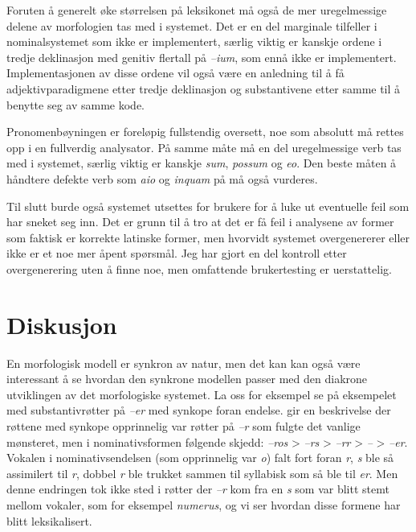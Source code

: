 \documentclass{article}
\let\w\emph
\begin{document}
Foruten \aa{} generelt \o{}ke st\o{}rrelsen p\aa{} leksikonet m\aa{} ogs\aa{}
de mer uregelmessige delene av morfologien tas med i systemet. Det er en del
marginale tilfeller i nominalsystemet som ikke er implementert, s\ae{}rlig
viktig er kanskje ordene i tredje deklinasjon med genitiv flertall p\aa{}
\w{--ium}, som enn\aa{} ikke er implementert. Implementasjonen av disse ordene
vil ogs\aa{} v\ae{}re en anledning til \aa{} f\aa{} adjektivparadigmene etter
tredje deklinasjon og substantivene etter samme til \aa{} benytte seg av samme
kode.

Pronomenb\o{}yningen er forel\o{}pig fullstendig oversett, noe som absolutt
m\aa{} rettes opp i en fullverdig analysator. P\aa{} samme m\aa{}te m\aa{} en
del uregelmessige verb tas med i systemet, s\ae{}rlig viktig er kanskje
\w{sum}, \w{possum} og \w{eo}. Den beste m\aa{}ten \aa{} h\aa{}ndtere defekte
verb som \w{aio} og \w{inquam} p\aa{} m\aa{} ogs\aa{} vurderes.

Til slutt burde ogs\aa{} systemet utsettes for brukere for \aa{} luke ut
eventuelle feil som har sneket seg inn. Det er grunn til \aa{} tro at det er
f\aa{} feil i analysene av former som faktisk er korrekte latinske former, men
hvorvidt systemet overgenererer eller ikke er et noe mer \aa{}pent
sp\o{}rsm\aa{}l. Jeg har gjort en del kontroll etter overgenerering uten \aa{}
finne noe, men omfattende brukertesting er uerstattelig.

\section{Diskusjon}
\label{diskusjon}
En morfologisk modell er synkron av natur, men det kan kan ogs\aa{} v\ae{}re
interessant \aa{} se hvordan den synkrone modellen passer med den diakrone
utviklingen av det morfologiske systemet. La oss for eksempel se p\aa{}
eksempelet med substantivr\o{}tter p\aa{} \w{--er} med synkope foran endelse.
 gir en beskrivelse der r\o{}ttene med synkope opprinnelig var
r\o{}tter p\aa{} \w{--r} som fulgte det vanlige m\o{}nsteret, men i
nominativsformen f\o{}lgende skjedd: \w{--ros} > \w{--rs} > \w{--rr} >
\w{--} > \w{--er}. Vokalen i nominativsendelsen (som
opprinnelig var \w{o}) falt fort foran \w{r}, \w{s} ble s\aa{} assimilert til
\w{r}, dobbel \w{r} ble trukket sammen til syllabisk \w{} som
s\aa{} ble til \w{er}. Men denne endringen tok ikke sted i r\o{}tter der
\w{--r} kom fra en \w{s} som var blitt stemt mellom vokaler, som for eksempel
\w{numerus}, og vi ser hvordan disse formene har blitt leksikalisert.
\end{document}
